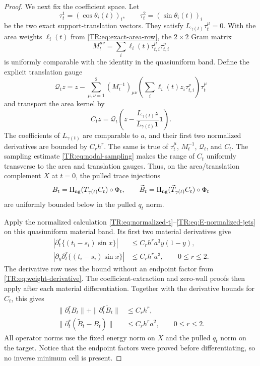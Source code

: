 \begin{proof}
We next fix the coefficient space.  Let
\[
 \tau_t^1=(\cos\theta_i(t))_i,\qquad
 \tau_t^2=(\sin\theta_i(t))_i
\]
be the two exact support-translation vectors.  They satisfy
$L_{\gamma(t)}\tau_t^\mu=0$.  With the area weights
$\ell_i(t)$ from \eqref{TR:eq:exact-area-row}, the $2\times2$ Gram matrix
\[
 M_t^{\mu\nu}=\sum_i\ell_i(t)\tau_{t,i}^\mu\tau_{t,i}^\nu
\]
is uniformly comparable with the identity in the quasiuniform band.
Define the explicit translation gauge
\begin{equation}\label{TR:eq:translation-gauge}
 \mathcal Q_tz=z-\sum_{\mu,\nu=1}^2
 (M_t^{-1})_{\mu\nu}
 \left(\sum_i\ell_i(t)z_i\tau_{t,i}^\nu\right)\tau_t^\mu
\end{equation}
and transport the area kernel by
\begin{equation}\label{TR:eq:area-transport}
 C_tz=\mathcal Q_t\left(
 z-\frac{L_{\gamma(t)}z}{L_{\gamma(t)}\mathbf1}\mathbf1\right).
\end{equation}
The coefficients of $L_{\gamma(t)}$ are comparable to $a$, and their
first two normalized derivatives are bounded by $C_rh^r$.  The same is
true of $\tau_t^\mu$, $M_t^{-1}$, $\mathcal Q_t$, and $C_t$.
The sampling estimate \eqref{TR:eq:nodal-sampling} makes the range of
$C_t$ uniformly transverse to the area and translation gauges.  Thus,
on the area/translation complement $X$ at $t=0$, the pulled trace injections
\begin{equation*}
 B_t=\Pi_{\rm ng}(T_{\gamma(t)}C_t)\circ\Phi_t,
 \qquad
 \widetilde B_t=\Pi_{\rm ng}(\widetilde T_{\gamma(t)}C_t)\circ\Phi_t
\end{equation*}
are uniformly bounded below in the pulled $q_t$ norm.

Apply the normalized calculation
\eqref{TR:eq:normalized-t}--\eqref{TR:eq:E-normalized-jets} on this
quasiuniform material band.  Its first two material derivatives give
\begin{align}
 \left|\partial_t^r\{(t_i-s_i)\sin x\}\right|
 &\le C_rh^ra^3y(1-y),\label{TR:eq:material-E-value}\\
 \left|\partial_y\partial_t^r\{(t_i-s_i)\sin x\}\right|
 &\le C_rh^ra^3,\qquad 0\le r\le2.
 \label{TR:eq:material-E-derivative}
\end{align}
The derivative row uses the bound without an endpoint factor from
\eqref{TR:eq:weight-derivative}.  The coefficient-extraction and zero-wall
proofs then apply after each material differentiation.  Together with
the derivative bounds for $C_t$, this gives
\begin{align}
 \|\partial_t^rB_t\|+\|\partial_t^r\widetilde B_t\|
 &\le C_rh^r,
 \label{TR:eq:B-material}\\
 \|\partial_t^r(\widetilde B_t-B_t)\|
 &\le C_rh^ra^2,\qquad 0\le r\le2.
 \label{TR:eq:DeltaB-material}
\end{align}
All operator norms use the fixed energy norm on $X$ and the pulled
$q_t$ norm on the target.  Notice that the endpoint factors were proved
before differentiating, so no inverse minimum cell is present.


\end{proof}
